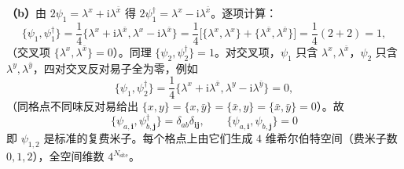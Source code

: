 \textbf{（b）}由 $2\psi_{1}=\lambda^{x}+\mathrm{i}\lambda^{\bar x}$ 得 $2\psi_{1}^{\dagger}=\lambda^{x}-\mathrm{i}\lambda^{\bar x}$。逐项计算：
\begin{equation*}
\{\psi_1,\psi_1^{\dagger}\}=\frac14\{\lambda^{x}+\mathrm{i}\lambda^{\bar x},\lambda^{x}-\mathrm{i}\lambda^{\bar x}\}
=\frac14\big[\{\lambda^{x},\lambda^{x}\}+\{\lambda^{\bar x},\lambda^{\bar x}\}\big]
=\frac14(2+2)=1,
\end{equation*}
（交叉项 $\{\lambda^{x},\lambda^{\bar x}\}=0$）。同理 $\{\psi_2,\psi_2^{\dagger}\}=1$。对交叉项，$\psi_1$ 只含 $\lambda^{x},\lambda^{\bar x}$，$\psi_2$ 只含 $\lambda^{y},\lambda^{\bar y}$，四对交叉反对易子全为零，例如
\begin{equation*}
\{\psi_1,\psi_2^{\dagger}\}=\frac14\{\lambda^{x}+\mathrm{i}\lambda^{\bar x},\lambda^{y}-\mathrm{i}\lambda^{\bar y}\}=0,
\end{equation*}
（同格点不同味反对易给出 $\{x,y\}=\{x,\bar y\}=\{\bar x,y\}=\{\bar x,\bar y\}=0$）。故
\begin{equation*}
\boxed{\;\{\psi_{a,\pmb i},\psi_{b,\pmb j}^{\dagger}\}=\delta_{ab}\delta_{\pmb{i}\pmb j},\qquad
\{\psi_{a,\pmb i},\psi_{b,\pmb j}\}=0\;}
\end{equation*}
即 $\psi_{1,2}$ 是标准的复费米子。每个格点上由它们生成 $4$ 维希尔伯特空间（费米子数 $0,1,2$），全空间维数 $4^{N_{\text{site}}}$。

